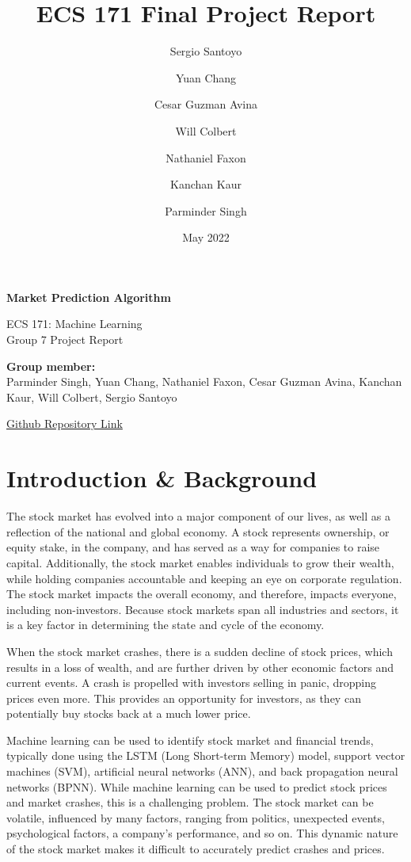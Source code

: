 \documentclass{article}
\title{ECS 171 Final Project Report}
\author{
  Sergio Santoyo\\
  \and
  Yuan Chang\\
  \and
  Cesar Guzman Avina\\
  \and
  Will Colbert\\
  \and
  Nathaniel Faxon\\
  \and
  Kanchan Kaur\\
  \and
  Parminder Singh\\
}
\date{May 2022}
\begin{document}
\begin{titlepage}
   \begin{center}
       \vspace*{4cm}
		\Large
       \textbf{Market Prediction Algorithm}

       \vspace{0.5cm}
        ECS 171: Machine Learning \\
        Group 7 Project Report
       \vspace{1.5cm}

       \textbf{Group member:}\\
Parminder Singh, Yuan Chang, Nathaniel Faxon, Cesar Guzman Avina, Kanchan Kaur, Will Colbert, Sergio Santoyo

       \vfill
       \href{https://github.com/nfax117/ECS171_Proj1}{Github Repository Link}
            
       \vspace{0.8cm}
            
   \end{center}
\end{titlepage}


\section{Introduction \& Background}
The stock market has evolved into a major component of our lives, as well as a reflection of the national and global economy. A stock represents ownership, or equity stake, in the company, and has served as a way for companies to raise capital. Additionally, the stock market enables individuals to grow their wealth, while holding companies accountable and keeping an eye on corporate regulation. The stock market impacts the overall economy, and therefore, impacts everyone, including non-investors. Because stock markets span all industries and sectors, it is a key factor in determining the state and cycle of the economy.

When the stock market crashes, there is a sudden decline of stock prices, which results in a loss of wealth, and are further driven by other economic factors and current events. A crash is propelled with investors selling in panic, dropping prices even more. This provides an opportunity for investors, as they can potentially buy stocks back at a much lower price.

Machine learning can be used to identify stock market and financial trends, typically done using the LSTM (Long Short-term Memory) model, support vector machines (SVM), artificial neural networks (ANN), and back propagation neural networks (BPNN). While machine learning can be used to predict stock prices and market crashes, this is a challenging problem. The stock market can be volatile, influenced by many factors, ranging from politics, unexpected events, psychological factors, a company’s performance, and so on. This dynamic nature of the stock market makes it difficult to accurately predict crashes and prices.
\end{document}
